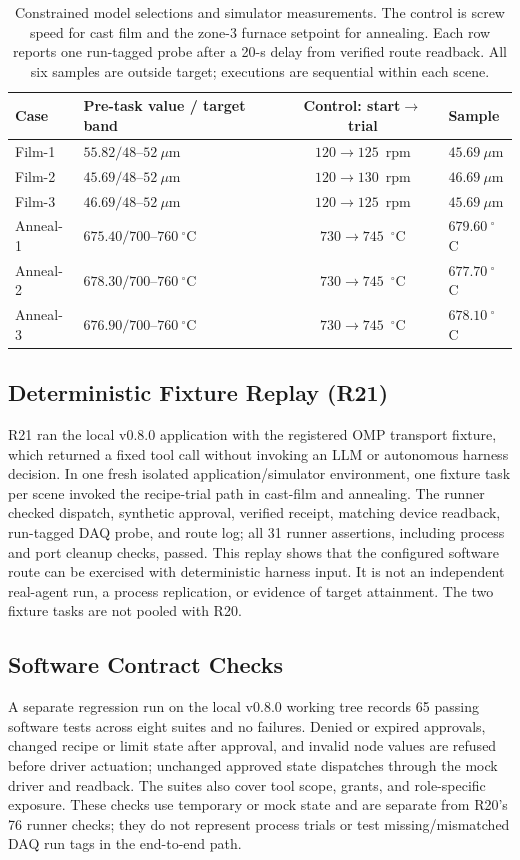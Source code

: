 \begin{table}[!t]
\centering
\caption{Constrained model selections and simulator measurements. The control
is screw speed for cast film and the zone-3 furnace setpoint for annealing.
Each row reports one run-tagged probe after a 20-s delay from verified route
readback. All six samples are outside target; executions are sequential within
each scene.}
\label{tab:q8}
\footnotesize
\setlength{\tabcolsep}{2.5pt}
\begin{tabularx}{\columnwidth}{@{}lXcX@{}}
\toprule
Case & Pre-task value / target band & Control: start$\to$trial & Sample \\
\midrule
Film-1 & $55.82/48$--$52~\mu$m & $120\to125$~rpm & $45.69~\mu$m \\
Film-2 & $45.69/48$--$52~\mu$m & $120\to130$~rpm & $46.69~\mu$m \\
Film-3 & $46.69/48$--$52~\mu$m & $120\to125$~rpm & $45.69~\mu$m \\
Anneal-1 & $675.40/700$--$760~^{\circ}$C & $730\to745$~$^{\circ}$C & $679.60~^{\circ}$C \\
Anneal-2 & $678.30/700$--$760~^{\circ}$C & $730\to745$~$^{\circ}$C & $677.70~^{\circ}$C \\
Anneal-3 & $676.90/700$--$760~^{\circ}$C & $730\to745$~$^{\circ}$C & $678.10~^{\circ}$C \\
\bottomrule
\end{tabularx}
\end{table}

\subsection{Deterministic Fixture Replay (R21)}
R21 ran the local v0.8.0 application with the registered OMP transport fixture,
which returned a fixed tool call without invoking an LLM or autonomous harness
decision. In one fresh isolated application/simulator environment, one fixture
task per scene invoked the recipe-trial path in cast-film and annealing. The
runner checked dispatch, synthetic approval, verified receipt, matching device
readback, run-tagged DAQ probe, and route log; all 31 runner assertions,
including process and port cleanup checks, passed. This replay shows that the
configured software route can be exercised with deterministic harness input.
It is not an independent real-agent run, a process replication, or evidence of
target attainment. The two fixture tasks are not pooled with R20.

\subsection{Software Contract Checks}
A separate regression run on the local v0.8.0 working tree records 65 passing
software tests across eight suites and no failures. Denied or expired
approvals, changed recipe or limit state after approval, and invalid node
values are refused before driver actuation; unchanged approved state dispatches
through the mock driver and readback. The suites also cover tool scope, grants,
and role-specific exposure. These checks use temporary or mock state and are
separate from R20's 76 runner checks; they do not represent process trials or
test missing/mismatched DAQ run tags in the end-to-end path.

